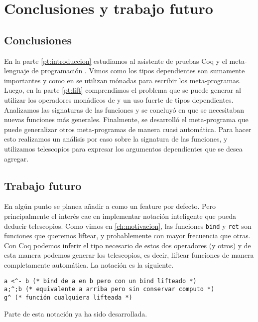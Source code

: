 \chapter{Conclusiones y trabajo futuro}\label{ch:conclusion}

\section{Conclusiones}

En la parte \ref{pt:introduccion} estudiamos al asistente de pruebas Coq y el meta-lenguaje de programación \mtac. Vimos como los tipos dependientes son sumamente importantes y como en \mtac se utilizan mónadas para escribir los meta-programas. 
Luego, en la parte \ref{pt:lift} comprendimos el problema que se puede generar al utilizar los operadores monádicos de \mtac y un uso fuerte de tipos dependientes. Analizamos las signaturas de las funciones y se concluyó en que se necesitaban nuevas funciones más generales.
Finalmente, se desarrolló el meta-programa \lift que puede generalizar otros meta-programas de manera cuasi automática. Para hacer esto realizamos un análisis por caso sobre la signatura de las funciones, y utilizamos telescopios para expresar los argumentos dependientes que se desea agregar.

\section{Trabajo futuro}

En algún punto se planea añadir \lift a \mtac como un feature por defecto. Pero principalmente el interés cae en implementar notación inteligente que pueda deducir telescopios. Como vimos en \ref{ch:motivacion}, las funciones \lstinline{bind} y \lstinline{ret} son funciones que queremos liftear, y probablemente con mayor frecuencia que otras. Con Coq podemos inferir el tipo necesario de estos dos operadores (y otros) y de esta manera podemos generar los telescopios, es decir, liftear funciones de manera completamente automática.
La notación es la siguiente.

\begin{lstlisting}
a <^- b (* bind de a en b pero con un bind lifteado *)
a;^;b (* equivalente a arriba pero sin conservar computo *)
g^ (* función cualquiera lifteada *)
\end{lstlisting}

Parte de esta notación ya ha sido desarrollada.